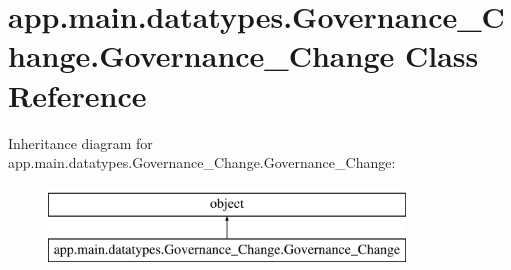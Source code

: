 \hypertarget{classapp_1_1main_1_1datatypes_1_1Governance__Change_1_1Governance__Change}{}\section{app.\+main.\+datatypes.\+Governance\+\_\+\+Change.\+Governance\+\_\+\+Change Class Reference}
\label{classapp_1_1main_1_1datatypes_1_1Governance__Change_1_1Governance__Change}
Inheritance diagram for app.\+main.\+datatypes.\+Governance\+\_\+\+Change.\+Governance\+\_\+\+Change\+:\begin{figure}[H]
\begin{center}
\leavevmode
\includegraphics[height=2.000000cm]{classapp_1_1main_1_1datatypes_1_1Governance__Change_1_1Governance__Change}
\end{center}
\end{figure}
